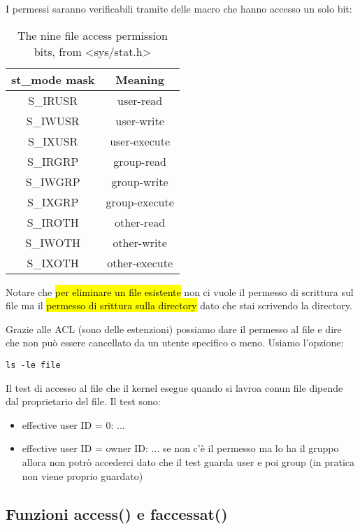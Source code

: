I permessi saranno verificabili tramite delle macro che hanno accesso un solo bit:

\begin{table}[!h]
	\centering
	\begin{tabular}{|c|c|}
		\hline
		\textbf{st\_mode mask} & \textbf{Meaning} \\\hline\hline
		S\_IRUSR & user-read \\
		S\_IWUSR & user-write \\
		S\_IXUSR & user-execute \\\hline
		S\_IRGRP & group-read \\
		S\_IWGRP & group-write \\
		S\_IXGRP & group-execute \\\hline
		S\_IROTH & other-read \\
		S\_IWOTH & other-write \\
		S\_IXOTH & other-execute \\\hline
	\end{tabular}
	\caption{\label{tab:widgets}The nine file access permission bits, from <sys/stat.h>}
\end{table}


Notare che \hl{per eliminare un file esistente} non ci vuole il permesso di scrittura sul file ma il \hl{permesso di srittura sulla directory} dato che stai scrivendo la directory.

Grazie alle ACL (sono delle estenzioni) possiamo dare il permesso al file e dire che non può essere cancellato da un utente specifico o meno. Usiamo l'opzione:

\begin{lstlisting}
ls -le file
\end{lstlisting}

Il test di accesso al file che il kernel esegue quando si lavroa conun file dipende dal proprietario del file. Il test sono:

\begin{itemize}
	\item effective user ID = 0: ...
	\item effective user ID = owner ID: ... se non c'è il permesso ma lo ha il gruppo allora non potrò accederci dato che il test guarda user e poi group (in pratica non viene proprio guardato)
\end{itemize}


\subsection{Funzioni access() e faccessat()}

